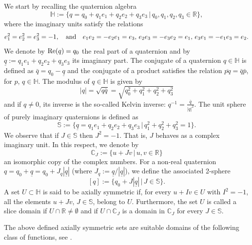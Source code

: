 \documentclass[reqno,11pt]{amsart}
\theoremstyle{definition}
\begin{document}
We start by recalling the quaternion algebra
\[
\mathbb{H}:= \{q=q_0+q_1e_1+q_2e_2+q_3e_3 \,| \, q_0, q_1, q_2, q_3 \in \mathbb{R}\},
\]
where the imaginary units satisfy the relations
\[
e_1^2=e_2^2=e_3^2=-1, \quad \hbox{and} \quad e_1e_2=-e_2e_1=e_3, \, e_2e_3=-e_3e_2=e_1, \, e_3e_1=-e_1e_3=e_2.
\]
We denote by $ \hbox{Re}(q)=q_0$ the real part of a quaternion and by $ \underline{q}:= q_1e_1+q_2e_2+q_3e_3$ its imaginary part. The conjugate of a quaternion $q \in \mathbb{H}$ is defined as $ \bar{q}=q_0- \underline{q}$ and the conjugate of a product satisfies the relation $\overline{pq}=\bar{q} \bar{p}$, for $p$, $q \in \mathbb{H}$. The modulus of $q\in \mathbb{H}$ is given by
\[
|q|= \sqrt{q \bar{q}}= \sqrt{q_0^2+q_1^2+q_2^2+q_3^2}
\]
and if $q\neq 0$, its inverse is the so-called Kelvin inverse: $q^{-1}=\frac{\bar{q}}{|q|^2}$. The unit sphere of purely imaginary quaternions is defined as
\[
\mathbb{S}:= \big\{\underline{q}=q_1e_1+q_2e_2+q_3e_3\, | \, q_1^2+q_2^2+q_3^2=1\big\}.
\]
We observe that if $ J \in \mathbb{S}$ then $J^2=-1$. That is, $J$ behaves as a complex imaginary unit. In this respect, we denote by
\[
\mathbb{C}_J:= \{u+Jv \, | \, u,v \in \mathbb{R}\}
\]
an isomorphic copy of the complex numbers. For a non-real quaternion $q=q_0+ \underline{q}=q_0+ J_q |\underline{q}|$ (where $J_q:= \underline{q}/ |\underline{q}|$), we define the associated 2-sphere
\[
[q]:= \big\{q_0+J |\underline{q}| \, | \, J \in \mathbb{S}\big\}.
\]
A set $U \subset \mathbb{H}$ is said to be axially symmetric if, for every $u+Iv \in U$ with $I^2=-1$, all the elements $u+Jv$, $J \in \mathbb{S}$, belong to $U$. Furthermore, the set $U$ is called a slice domain if $U \cap \mathbb{R} \neq \emptyset$ and if $U \cap \mathbb{C}_J$ is a domain in $ \mathbb{C}_J$ for every $J \in \mathbb{S}$.

\medskip


The above defined axially symmetric sets are suitable domains of the following class of functions, see \cite{ColomboSabadiniStruppa2011, CSSentire}.
\end{document}
